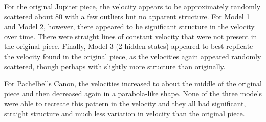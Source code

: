\documentclass{article} %
\begin{document}
For the original Jupiter piece, the velocity appears to be approximately randomly scattered about 80 with a few outliers but no apparent structure.  For Model 1 and Model 2, however, there appeared to be significant structure in the velocity over time. There were straight lines of constant velocity that were not present in the original piece.  Finally, Model 3 (2 hidden states) appeared to best replicate the velocity found in the original piece, as the velocities again appeared randomly scattered, though perhaps with slightly more structure than originally.

For Pachelbel's Canon, the velocities increased to about the middle of the original piece and then decreased again in a parabola-like shape.  None of the three models were able to recreate this pattern in the velocity and they all had significant, straight structure and much less variation in velocity than the original piece.
\end{document}
